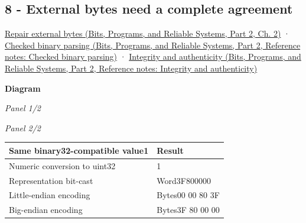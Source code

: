 \subsection{8 - External bytes need a complete agreement}\label{appendix-ef4d27797a92-external-bytes-need-a-complete-agreement}

\hypertarget{appendix-ef4d27797a92-external-bytes-need-a-complete-agreement}{}

\href{../01-Bits-Programs-and-Reliable-Systems-P02/main.pdf\#01-foundations-i-ch002-bytes-become-a-durable-agreement}{Repair external bytes (Bits, Programs, and Reliable Systems, Part 2, Ch. 2)} · \href{../01-Bits-Programs-and-Reliable-Systems-P02/main.pdf\#appendix-652d81568de9}{Checked binary parsing (Bits, Programs, and Reliable Systems, Part 2, Reference notes: Checked binary parsing)} · \href{../01-Bits-Programs-and-Reliable-Systems-P02/main.pdf\#appendix-cbe594d1ab0a}{Integrity and authenticity (Bits, Programs, and Reliable Systems, Part 2, Reference notes: Integrity and authenticity)}

\par\medskip\noindent\textbf{Diagram}\par
\par\noindent\textit{Panel 1/2}\par{}\par
\par\noindent\textit{Panel 2/2}\par{}\par

{\def\LTcaptype{none} %
\begin{longtable}[]{@{}ll@{}}
\toprule\noalign{}
Same binary32-compatible value1 & Result \\
\midrule\noalign{}
\endhead
\bottomrule\noalign{}
\endlastfoot
Numeric conversion to uint32 & 1 \\
Representation bit-cast & Word3F800000 \\
Little-endian encoding & Bytes00 00 80 3F \\
Big-endian encoding & Bytes3F 80 00 00 \\
\end{longtable}
}

